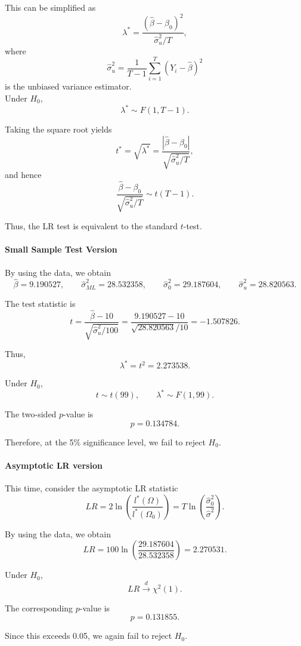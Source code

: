 \documentclass[12pt]{article}
\begin{document}
This can be simplified as
\[
\lambda^*
=
\frac{(\hat{\beta}-\beta_0)^2}{\hat{\sigma}_u^2/T},
\]
where
\[
\hat{\sigma}_u^2
=
\frac{1}{T-1}\sum_{i=1}^{T}(Y_i-\hat{\beta})^2
\]
is the unbiased variance estimator.\\

Under \(H_0\),
\[
\lambda^* \sim F(1, T-1).
\]

Taking the square root yields
\[
t^*
=
\sqrt{\lambda^*}
=
\frac{|\hat{\beta}-\beta_0|}{\sqrt{\hat{\sigma}_u^2/T}},
\]
and hence
\[
\frac{\hat{\beta}-\beta_0}{\sqrt{\hat{\sigma}_u^2/T}}
\sim t(T-1).
\]

Thus, the LR test is equivalent to the standard \(t\)-test.

\paragraph{Small Sample Test Version}

By using the data, we obtain
\[
\hat{\beta} = 9.190527,
\qquad
\hat{\sigma}_{ML}^2 = 28.532358,
\qquad
\hat{\sigma}_0^2 = 29.187604,
\qquad
\hat{\sigma}_u^2 = 28.820563.
\]

The test statistic is
\[
t
=
\frac{\hat{\beta}-10}{\sqrt{\hat{\sigma}_u^2/100}}
=
\frac{9.190527-10}{\sqrt{28.820563}/10}
=
-1.507826.
\]

Thus,
\[
\lambda^* = t^2 = 2.273538.
\]

Under \(H_0\),
\[
t \sim t(99),
\qquad
\lambda^* \sim F(1,99).
\]

The two-sided \(p\)-value is
\[
p = 0.134784.
\]

Therefore, at the 5\% significance level, we fail to reject \(H_0\).

\paragraph{Asymptotic LR version}

This time, consider the asymptotic LR statistic
\[
LR
=
2\ln\left(
\frac{l^*(\Omega)}{l^*(\Omega_0)}
\right)
=
T\ln\left(\frac{\hat{\sigma}_0^2}{\hat{\sigma}^2}\right).
\]

By using the data, we obtain
\[
LR
=
100\ln\left(\frac{29.187604}{28.532358}\right)
=
2.270531.
\]

Under \(H_0\),
\[
LR \xrightarrow{d} \chi^2(1).
\]

The corresponding \(p\)-value is
\[
p = 0.131855.
\]

Since this exceeds 0.05, we again fail to reject \(H_0\).
\end{document}
